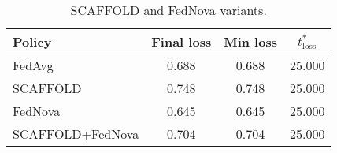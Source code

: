 \begin{table}[t]
\centering
\begin{tabular}{lccc}
\toprule
Policy & Final loss & Min loss & $t^*_{\text{loss}}$ \\
\midrule
FedAvg & 0.688 & 0.688 & 25.000 \\
SCAFFOLD & 0.748 & 0.748 & 25.000 \\
FedNova & 0.645 & 0.645 & 25.000 \\
SCAFFOLD+FedNova & 0.704 & 0.704 & 25.000 \\
\bottomrule
\end{tabular}
\caption{SCAFFOLD and FedNova variants.}
\label{tab:scaffold_fednova}
\end{table}